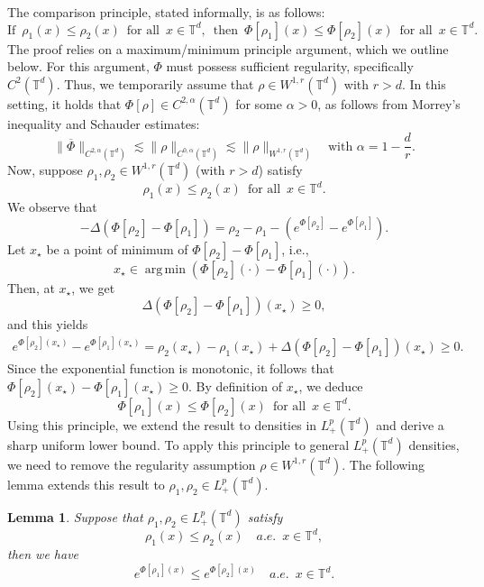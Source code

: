 \documentclass[11pt,reqno,a4paper]{amsart}
\newtheorem{lemma}{Lemma}[section]
\theoremstyle{definition}
\theoremstyle{remark}
\numberwithin{equation}{section}
\DeclareMathOperator*{\argmin}{arg\,min}
\newcommand{\T} {\mathbb T}
\newcommand{\lt}{\left}
\newcommand{\rt}{\right}
\begin{document}
The comparison principle, stated informally, is as follows:
\[
\mbox{If}\,\,\, \rho_1(x) \le \rho_2(x) \,\,\,\mbox{for all}\,\,\, x \in \T^d,\,\,\,\mbox{then}\,\,\, \Phi[\rho_1](x) \le \Phi[\rho_2](x)\,\,\,\mbox{for all}\,\,\, x \in \T^d.
\]
The proof relies on a maximum/minimum principle argument, which we outline below. For this argument, $\Phi$ must possess sufficient regularity, specifically $C^2(\T^d)$. Thus, we temporarily assume that $\rho \in W^{1,r}(\T^d)$ with $r>d$. In this setting, it holds that $\Phi[\rho] \in C^{2,\alpha}(\T^d)$ for some $\alpha >0$, as follows from Morrey's inequality and Schauder estimates:
\[
\|\overline{\Phi}\|_{C^{2,\alpha}(\T^d)}\lesssim \|\rho\|_{C^{0,\alpha}(\T^d)} \lesssim \|\rho\|_{W^{1,r}(\T^d)}\quad \mbox{with } \alpha=1-\frac dr.
\]
Now, suppose $\rho_1, \rho_2 \in W^{1,r}(\T^d)$ (with $r>d$) satisfy
\[
 \rho_1(x) \le \rho_2(x) \,\,\,\mbox{for all}\,\,\, x \in \T^d.
\]
We observe that
\[
-\Delta (\Phi[\rho_2] - \Phi[\rho_1]) = \rho_2 - \rho_1 - \lt(e^{\Phi[\rho_2]} - e^{\Phi[\rho_1]}\rt).
\]
Let $x_\star$ be a point of minimum of $\Phi[\rho_2] - \Phi[\rho_1]$, i.e.,
\[
x_\star \in \argmin \lt(\Phi[\rho_2](\cdot) - \Phi[\rho_1](\cdot)\rt).
\]
Then, at $x_\star$, we get
\[
\Delta (\Phi[\rho_2] - \Phi[\rho_1])(x_\star) \ge 0,
\]
and this yields
\begin{align*}
e^{\Phi[\rho_2](x_\star)} - e^{\Phi[\rho_1](x_\star)} = \rho_2(x_\star) - \rho_1(x_\star) + \Delta (\Phi[\rho_2] - \Phi[\rho_1])(x_\star)\ge 0.
\end{align*}
Since the exponential function is monotonic, it follows that $\Phi[\rho_2](x_\star) - \Phi[\rho_1](x_\star) \ge 0$. By definition of $x_\star$, we deduce  
\[
\Phi[\rho_1](x) \le \Phi[\rho_2](x)\,\,\,\mbox{for all}\,\,\, x \in \T^d.
\]
Using this principle, we extend the result to densities in $L^p_+(\T^d)$ and derive a sharp uniform lower bound. To apply this principle to general $L^p_+(\T^d)$ densities, we need to remove the regularity assumption $\rho\in W^{1,r}(\T^d)$. The following lemma extends this result to $\rho_1, \rho_2 \in L^p_+(\T^d)$.
\begin{lemma}\label{lem:comp}
Suppose that $\rho_1, \rho_2 \in L^p_+(\T^d)$ satisfy
\[
\rho_1(x) \le \rho_2(x)\quad\textit{a.e.} \,\,\,x\in\T^d,
\]
then we have
\[
e^{\Phi[\rho_1](x)} \le e^{\Phi[\rho_2](x)}\quad\textit{a.e.}\,\,\, x\in\T^d.
\]
\end{lemma}
\end{document}
